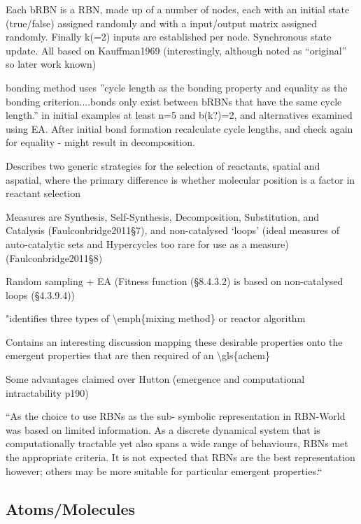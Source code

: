 				Each bRBN is a RBN, made up of a number of nodes, each with an
				initial state (true/false) assigned randomly and with a input/output
				matrix assigned randomly. Finally k(=2) inputs are established per
				node. Synchronous state update. All based on Kauffman1969
				(interestingly, although noted as ``original'' so later work known)

				
				bonding method uses ''cycle length as the bonding property and
				equality as the bonding criterion....bonds only exist between bRBNs
				that have the same cycle length.'' in initial examples at least n=5
				and b(k?)=2, and alternatives examined using EA. After initial bond
				formation recalculate cycle lengths, and check again for equality -
				might result in decomposition.

			Describes two generic strategies for the selection of reactants,
			spatial and aspatial, where the primary difference is whether
			molecular position is a factor in reactant selection
			
			Measures are Synthesis, Self-Synthesis, Decomposition, Substitution,
			and Catalysis (Faulconbridge2011§7), and non-catalysed `loops' (ideal
			measures of auto-catalytic sets and Hypercycles too rare for use as a
			measure) (Faulconbridge2011§8)
		
			Random sampling + EA (Fitness function (§8.4.3.2) is based on
			non-catalysed loops (§4.3.9.4))		

			"identifies three types of \textbackslash{}emph\{mixing method\} or
			reactor algorithm			

			Contains an interesting discussion mapping these desirable properties
			onto the emergent properties that are then required of an
			\textbackslash{}gls\{achem\}
			
			Some advantages claimed over Hutton (emergence and computational
			intractability p190)

			``As the choice to use RBNs as the sub- symbolic representation in
			RBN-World was based on limited information. As a discrete dynamical
			system that is computationally tractable yet also spans a wide range
			of behaviours, RBNs met the appropriate criteria. It is not expected
			that RBNs are the best representation however; others may be more
			suitable for particular emergent properties.``
					
\subsection{Atoms/Molecules}
		
